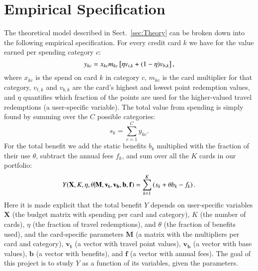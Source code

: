 \section{Empirical Specification} \label{sec:Specification}

The theoretical model described in Sect.~\ref{sec:Theory} can be broken down into the following empirical specification. For every credit card $k$ we have for the value earned per spending category $c$:
%
\begin{equation}
    y_{kc} = x_{kc}\/m_{kc} \left[ \eta\/ v_{t,k} + 
    (1 - \eta)\/ v_{b,k}\right],
\end{equation}
%
where $x_{kc}$ is the spend on card $k$ in category $c$, $m_{kc}$ is the card multiplier for that category, $v_{t,k}$ and $v_{b,k}$ are the card's highest and lowest point redemption values, and $\eta$ quantifies which fraction of the points are used for the higher-valued travel redemptions (a user-specific variable). The total value from spending is simply found by summing over the $C$ possible categories:
%
\begin{equation}
    s_{k} = \sum_{c=1}^{C}y_{kc}.
\end{equation}
%
For the total benefit we add the static benefits $b_{k}$ multiplied with the fraction of their use $\theta$, subtract the annual fees $f_{k}$, and sum over all the $K$ cards in our portfolio:
%
\begin{equation} \label{eq:specification}
    Y(\mathbf{X}, K, \eta, \theta | \mathbf{M}, \mathbf{v_{t}}, \mathbf{v_{b}}, \mathbf{b}, \mathbf{f} ) = \sum_{k=1}^{K}\left( s_{k} + \theta\/ b_{k} - f_{k}\right).
\end{equation}
%
Here it is made explicit that the total benefit $Y$ depends on user-specific variables $\mathbf{X}$ (the budget matrix with spending per card and category), $K$ (the number of cards), $\eta$ (the fraction of travel redemptions), and $\theta$ (the fraction of benefits used), and the card-specific parameters $\mathbf{M}$ (a matrix with the multipliers per card and category), $\mathbf{v_{t}}$ (a vector with travel point values), $\mathbf{v_{b}}$ (a vector with base values), $\mathbf{b}$ (a vector with benefits), and $\mathbf{f}$ (a vector with annual fees).
The goal of this project is to study $Y$ as a function of its variables, given the parameters.